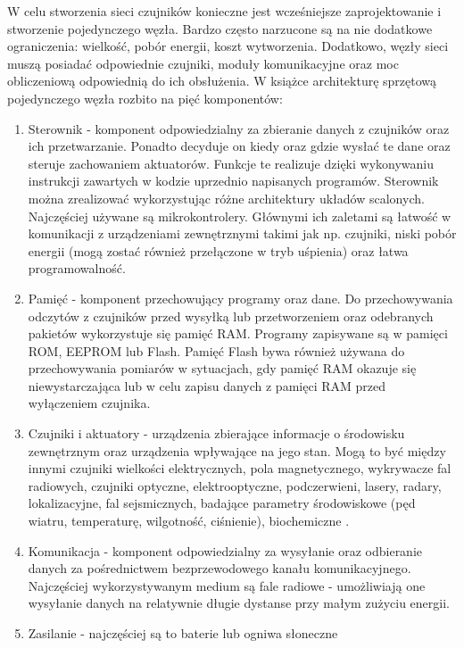 W celu stworzenia sieci czujników konieczne jest wcześniejsze zaprojektowanie i stworzenie pojedynczego węzła. Bardzo często narzucone są na nie dodatkowe ograniczenia: wielkość, pobór energii, koszt wytworzenia. Dodatkowo, węzły sieci muszą posiadać odpowiednie czujniki, moduły komunikacyjne oraz moc obliczeniową odpowiednią do ich obsłużenia. W książce \cite{Karl2006} architekturę sprzętową pojedynczego węzła rozbito na pięć komponentów:
\begin{enumerate}
	\item Sterownik - komponent odpowiedzialny za zbieranie danych z czujników oraz ich przetwarzanie. Ponadto decyduje on kiedy oraz gdzie wysłać te dane oraz steruje zachowaniem aktuatorów. Funkcje te realizuje dzięki wykonywaniu instrukcji zawartych w kodzie uprzednio napisanych programów. Sterownik można zrealizować wykorzystując różne architektury układów scalonych. Najczęściej używane są mikrokontrolery. Głównymi ich zaletami są łatwość w komunikacji z urządzeniami zewnętrznymi takimi jak np. czujniki, niski pobór energii (mogą zostać również przełączone w tryb uśpienia) oraz łatwa programowalność.
	\item Pamięć - komponent przechowujący programy oraz dane. Do przechowywania odczytów z czujników przed wysyłką lub przetworzeniem oraz odebranych pakietów wykorzystuje się pamięć RAM. Programy zapisywane są w pamięci ROM, EEPROM lub Flash. Pamięć Flash bywa również używana do przechowywania pomiarów w sytuacjach, gdy pamięć RAM okazuje się niewystarczająca lub w celu zapisu danych z pamięci RAM przed wyłączeniem czujnika.   
	\item Czujniki i aktuatory - urządzenia zbierające informacje o środowisku zewnętrznym oraz urządzenia wpływające na jego stan. Mogą to być między innymi czujniki wielkości elektrycznych, pola magnetycznego, wykrywacze fal radiowych, czujniki optyczne, elektrooptyczne, podczerwieni, lasery, radary, lokalizacyjne, fal sejsmicznych, badające parametry środowiskowe (pęd wiatru, temperaturę, wilgotność, ciśnienie), biochemiczne \cite{Sohraby2006}.
	\item Komunikacja - komponent odpowiedzialny za wysyłanie oraz odbieranie danych za pośrednictwem bezprzewodowego kanału komunikacyjnego. Najczęściej wykorzystywanym medium są fale radiowe - umożliwiają one wysyłanie danych na relatywnie długie dystanse przy małym zużyciu energii. 
	\item Zasilanie - najczęściej są to baterie lub ogniwa słoneczne
\end{enumerate}

